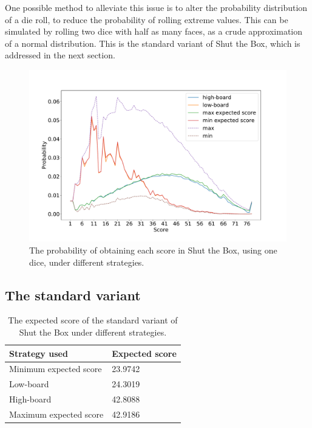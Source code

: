One possible method to alleviate this issue is to alter the probability distribution of a die roll, to reduce the probability of rolling extreme values. This can be simulated by rolling two dice with half as many faces, as a crude approximation of a normal distribution. This is the standard variant of Shut the Box, which is addressed in the next section.

\begin{figure}[h]
    \centering
    \includegraphics[width=\textwidth]{images/ShutTheBox/stb12_1d12_prob_score.pdf}
    \caption{The probability of obtaining each score in Shut the Box, using one dice, under different strategies.}
\label{cs1:stb12_1d12_prob_score}
\end{figure}

\subsection{The standard variant}
\label{cs1:stb_standard}

\begin{table}[h]
    \centering
    \begin{tabular}{@{}ll@{}}
    \toprule
    Strategy used                   & Expected score     \\ \midrule
    \multicolumn{1}{l|}{Minimum expected score}    & 23.9742  \\
    \multicolumn{1}{l|}{Low-board}  & 24.3019 \\
    \multicolumn{1}{l|}{High-board} & 42.8088 \\
    \multicolumn{1}{l|}{Maximum expected score}    & 42.9186
    \end{tabular}
    \caption{The expected score of the standard variant of Shut the Box under different strategies.}
    \label{cs1:exp_value_results}
\end{table}

